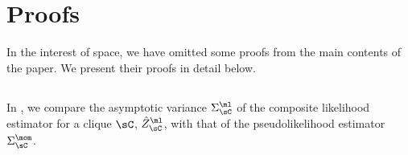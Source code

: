 \section{Proofs}
\label{app:proofs}

In the interest of space, we have omitted some proofs from
the main contents of the paper. We present their proofs in detail below.

\subsection{}
\label{app:pw-variance-proof}

In , we compare the asymptotic variance $\Sigma^\ml_\sC$ of the
composite likelihood estimator for a clique $\sC$, $\hat Z^\ml_\sC$, with
that of the pseudolikelihood estimator $\Sigma^\mom_\sC$.

